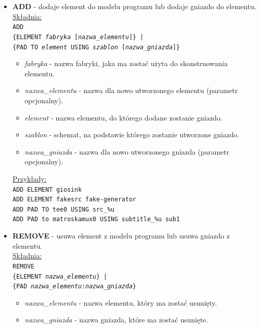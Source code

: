 \documentclass[12pt]{article}
\begin{document}
\begin{itemize}
  \setlength{\itemsep}{0em}
\item \textbf{ADD} - dodaje element do modelu programu lub dodaje gniazdo do elementu.
\underline{Składnia:} \\
\texttt{ADD \\
\hspace*{2em} \{ELEMENT \textit{fabryka} [\textit{nazwa\_elementu}]\} | \\
\hspace*{2em} \{PAD TO \textit{element} USING \textit{szablon} [\textit{nazwa\_gniazda}]\} }
\begin{itemize}
\item \textit{fabryka} - nazwa fabryki, jaka ma zostać użyta do skonstruowania elementu.
\item \textit{nazwa\_elementu} - nazwa dla nowo utworzonego elementu (parametr opcjonalny).
\item \textit{element} - nazwa elementu, do którego dodane zostanie gniazdo.
\item \textit{szablon} - schemat, na podstawie którego zostanie utworzone gniazdo.
\item \textit{nazwa\_gniazda} - nazwa dla nowo utworzonego gniazda (parametr opcjonalny).
\end{itemize}
\underline{Przykłady:} \\
\texttt{ADD ELEMENT giosink} \\
\texttt{ADD ELEMENT fakesrc fake-generator} \\
\texttt{ADD PAD TO tee0 USING src\_\%u} \\
\texttt{ADD PAD to matroskamux0 USING subtitle\_\%u sub1}
\cleardoublepage
\item \textbf{REMOVE} - usuwa element z modelu programu lub usuwa gniazdo z elementu. \\
\underline{Składnia:} \\
\texttt{REMOVE \\
\hspace*{2em} \{ELEMENT \textit{nazwa\_elementu}\} | \\
\hspace*{2em} \{PAD \textit{nazwa\_elementu}:\textit{nazwa\_gniazda}\}}
\begin{itemize}
\item \textit{nazwa\_elementu} - nazwa elementu, który ma zostać usunięty.
\item \textit{nazwa\_gniazda} - nazwa gniazda, które ma zostać usunięte.
\end{itemize}

\end{itemize}
\end{document}
